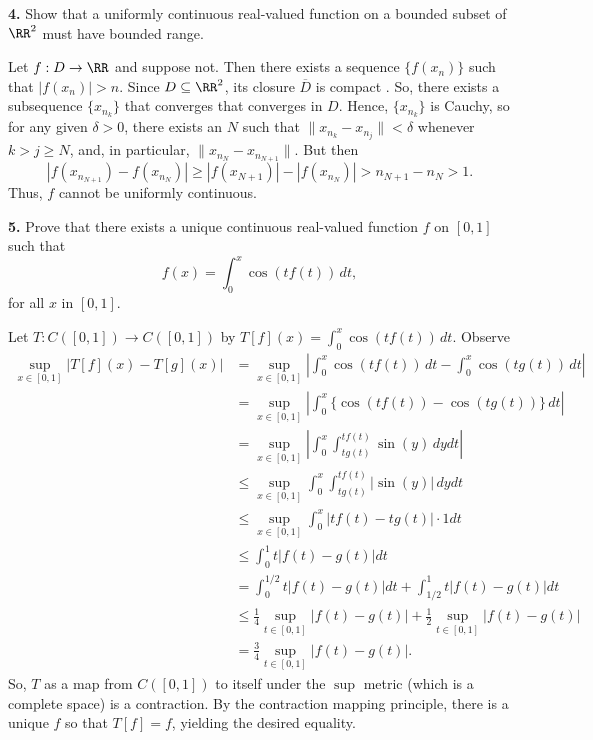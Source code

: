 \documentclass{homework}
\author{Kevin Joyce}
\begin{document}
 
\newcommand{\figref}[1]{\figurename~\ref{#1}}
\renewcommand{\bar}{\overline}
\renewcommand{\hat}{\widehat}
\renewcommand{\SS}{\mathcal S}
\newcommand{\eps}{\varepsilon}
\newcommand{\TTheta}{\overline{\underline \Theta} }
\newcommand{\del}{\partial}
\newcommand{\approxsim}{\overset{\cdotp}{\underset{\cdotp}{\sim}}}
\newcommand{\FF}{\mathcal F}
\renewcommand{\Re}{\mathrm{Re}\,}
\renewcommand{\Im}{\mathrm{Im}\,}
\newcommand{\HH}{\mathcal H}
\nocite{*}

{\bf 4.} Show that a uniformly continuous real-valued function on a bounded subset of $\RR^2$ must have bounded range.

\begin{solution}
  Let $f:D\to \RR$ and suppose not. Then there exists a sequence $\{f(x_n)\}$
  such that $|f(x_n)| >n$.  Since $D\subseteq \RR^2$, its closure $\bar D$ is
  compact \cite[thm.~9.2.7]{strichartz00}.  So, there exists a subsequence
  $\{x_{n_k}\}$ that converges that converges in $D$.
  Hence, $\{x_{n_k}\}$ is Cauchy, so for any given $\delta>0$, there
  exists an $N$ such that $\|x_{n_k} - x_{n_j}\| < \delta$ whenever $k>j\ge N$,
  and, in particular, $\|x_{n_N} - x_{n_{N+1}}\|$.  But then
  $$
    |f(x_{n_{N+1}}) - f(x_{n_N})| 
    \ge |f(x_{N+1})| - |f(x_{n_N})| 
    >n_{N+1} - n_N
    >1.
  $$
  Thus, $f$ cannot be uniformly continuous. 
\end{solution}

{\bf 5.} Prove that there exists a unique continuous real-valued function $f$ on $[0,1]$ such that 
$$
  f(x) = \int_0^x \cos(tf(t))\,dt,
$$
for all $x$ in $[0,1]$.

\begin{solution}
Let $T:C([0,1]) \to C([0,1])$ by $T[f](x) = \int_0^x \cos(tf(t))\,dt$. Observe
\begin{align*}
  \sup_{x\in[0,1]}|T[f](x) - T[g](x)|
  &= \sup_{x\in[0,1]} \left| \int_0^x\cos(tf(t))\,dt - \int_0^x\cos(tg(t))\,dt\right|\\ 
  &= \sup_{x\in[0,1]} \left| \int_0^x\big\{\cos(tf(t)) - \cos(tg(t))\big\}\,dt\right|\\
  &= \sup_{x\in[0,1]} \left| \int_0^x\int_{tg(t)}^{tf(t)}\sin(y)\,dydt\right|\\
  &\le \sup_{x\in[0,1]} \int_0^x\int_{tg(t)}^{tf(t)}|\sin(y)|\,dydt\\
  &\le \sup_{x\in[0,1]} \int_0^x|tf(t) - tg(t)|\cdot 1dt\\
  &\le \int_0^1t|f(t) - g(t)|dt\\
  &= \int_0^{1/2}t|f(t) - g(t)|dt + \int_{1/2}^1t|f(t) - g(t)|dt\\
  &\le \frac14 \sup_{t\in[0,1]}|f(t) - g(t)| + \frac 12\sup_{t\in[0,1]}|f(t) - g(t)|\\
  &= \frac34 \sup_{t\in[0,1]}|f(t) - g(t)|.
\end{align*}
So, $T$ as a map from $C([0,1])$ to itself under the $\sup$ metric (which is a complete space) is a contraction.  By the contraction mapping principle, there is a unique $f$ so that $T[f] = f$, yielding the desired equality.
\end{solution}
\end{document}
